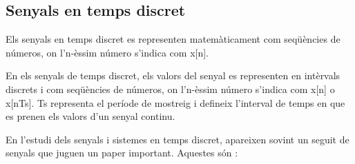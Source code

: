 \subsection{Senyals en temps discret}
\par Els senyals en temps discret es representen matemàticament com seqüències de números, on l'n-èssim número s'indica com x[n].
\par En els senyals de temps discret, els valors del senyal es representen en intèrvals discrets i com seqüències de números, on l'n-èssim número s'indica com x[n] o x[nTs]. Ts representa el període de mostreig i defineix l'interval de temps en que es prenen els valors d'un senyal continu. 
\par En l'estudi dels senyals i sistemes en temps discret, apareixen sovint un seguit de senyals que juguen un paper important. Aquestes són \cite{DiscreteTimeSP}:
